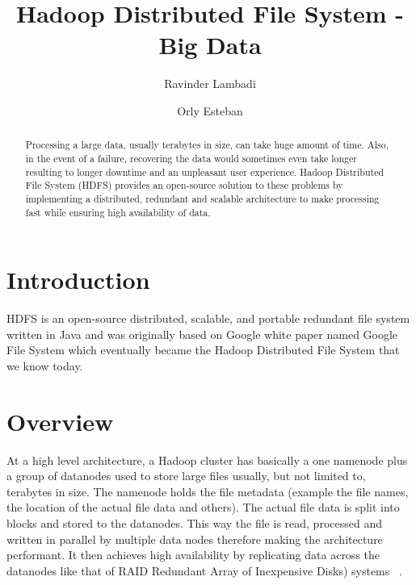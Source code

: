 \title{Hadoop Distributed File System - Big Data}

\author{Ravinder Lambadi}


\author{Orly Esteban}



\begin{abstract}
Processing a large data, usually terabytes in size, can take huge
amount of time. Also, in the event of a failure, recovering the
data would sometimes even take longer resulting to longer 
downtime and an unpleasant user experience. Hadoop Distributed
File System (HDFS) provides an open-source solution to these problems
by implementing a distributed, redundant and scalable architecture
to make processing fast while ensuring high availability of data.

\end{abstract}


\maketitle

\section{Introduction}

HDFS is an open-source distributed, scalable, and portable redundant
file system written in Java and was originally based on Google white
paper named Google File System which eventually became the Hadoop
Distributed File System that we know today. 
 
\section{Overview}
 
At a high level architecture, a Hadoop cluster has basically a one
namenode plus a group of datanodes used to store large files usually,
but not limited to, terabytes in size. The namenode holds the file
metadata (example the file names, the location of the actual file
data and others). The actual file data is split into blocks and
stored to the datanodes. This way the file is read, processed and
written in parallel by multiple data nodes therefore making the 
architecture performant. It then achieves high availability by
replicating data across the datanodes like that of RAID
Redundant Array of Inexpensive Disks) systems ~\cite{hid-sp18-506-hdfs}.

